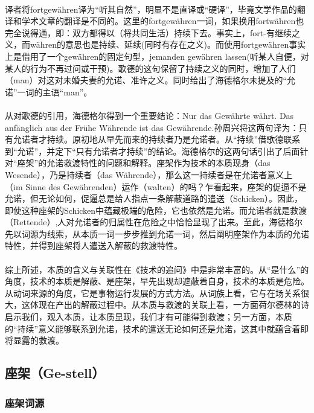 \documentclass{article}
\begin{document}
			\paragraph{}
			译者将fortgewähren译为“听其自然”，明显不是直译或“硬译”，毕竟文学作品的翻译和学术文章的翻译是不同的。这里的fortgewähren一词，如果换用fortwähren也完全说得通，即：双方都得以（将共同生活）持续下去。事实上，fort-有继续之义，而währen的意思也是持续、延续(同时有存在之义)。而使用fortgewähren事实上是借用了一个gewähren的固定句型，jemanden gewähren lassen(听某人自便，对某人的行为不再过问或干预)。歌德的这句保留了持续之义的同时，增加了人们（man）对这对未婚夫妻的允诺、准许之义。同时给出了海德格尔未提及的“允诺”一词的主语“man”。
			\paragraph{}
			从对歌德的引用，海德格尔得到一个重要结论：Nur das Gewährte währt. Das anfänglich aus der Frühe Währende ist das Gewährende.\cite{Frage_n_Tech}孙周兴将这两句译为：只有允诺者才持续。原初地从早先而来的持续者乃是允诺者。\cite[pg. 949]{slct_Hei_Szx}从“持续”借歌德联系到“允诺”，并定下“只有允诺者才持续”的结论。海德格尔的这两句话引出了后面针对“座架”的允诺救渡特性的问题和解释。座架作为技术的本质现身（das Wesende），乃是持续者（das Währende），那么这一持续者是在允诺者意义上（im Sinne des Gewährenden）运作（walten）的吗？\cite[pg. 949]{slct_Hei_Szx}乍看起来，座架的促逼不是允诺，但无论如何，促逼总是给人指点一条解蔽道路的遣送（Schicken）。因此，即使这种座架的Schicken中蕴藏极端的危险，它也依然是允诺。而允诺者就是救渡（Rettende）,人对允诺者的归属性在危险之中恰恰显现了出来。至此，海德格尔先以词源为线索，从本质一词一步步推到允诺一词，然后阐明座架作为本质的允诺特性，并得到座架将人遣送入解蔽的救渡特性。
			\paragraph{}
			综上所述，本质的含义与关联性在《技术的追问》中是非常丰富的。从“是什么”的角度，技术的本质是解蔽、是座架，早先出现却遮蔽着自身，技术的本质是危险。从动词来源的角度，它是事物运行发展的方式方法。从词族上看，它与在场关系很大，这体现在产出的解蔽过程中。从本质与救渡的关联上看，一方面荷尔德林的诗启示我们，观入本质，让本质显现，我们才有可能得到救渡；另一方面，本质的“持续”意义能够联系到允诺，技术的遣送无论如何还是允诺，这其中就蕴含着即将显露的救渡。
	\subsection{座架（Ge-stell）}
		\subsubsection{座架词源}
\end{document}
